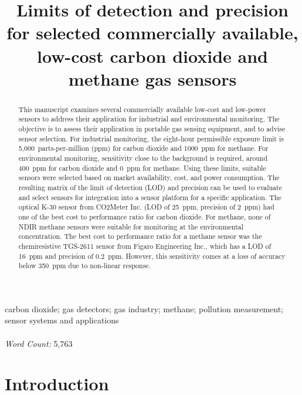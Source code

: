 \documentclass[times]{joehreview}
\begin{document}
	
	\begin{frontmatter}
		\title{Limits of detection and precision for selected commercially available, low-cost carbon dioxide and methane gas sensors}
		\begin{abstract} 
			
			This manuscript examines several commercially available low-cost and low-power sensors to address their application for industrial and environmental monitoring.  The objective is to assess their application in portable gas sensing equipment, and to advise sensor selection.  For industrial monitoring, the eight-hour permissible exposure limit is 5,000~parts-per-million (ppm) for carbon dioxide and 1000~ppm for methane.  For environmental monitoring, sensitivity close to the background is required, around 400~ppm for carbon dioxide and 0~ppm for methane.  Using these limits, suitable sensors were selected based on market availability, cost, and power consumption.  The resulting matrix of the limit of detection (LOD) and precision can be used to evaluate and select sensors for integration into a sensor platform for a specific application.  The optical K-30 sensor from CO2Meter Inc. (LOD of 25~ppm, precision of 2~ppm) had one of the best cost to performance ratio for carbon dioxide.  For methane, none of NDIR methane sensors were suitable for monitoring at the environmental concentration.  The best cost to performance ratio for a methane sensor was the chemiresistive TGS-2611 sensor from Figaro Engineering Inc., which has a LOD of 16~ppm and precision of 0.2~ppm.  However, this sensitivity comes at a loss of accuracy below 350~ppm due to non-linear response.
			
		\end{abstract}
		
		\begin{keyword}
			carbon dioxide; gas detectors; gas industry; methane; pollution measurement; sensor systems and applications
			\\~\\
			\textit{Word Count:} 5,763
		\end{keyword}
		
	\end{frontmatter}
	
	
	\section*{Introduction}
	\label{sec:intro}
	
\end{document}
